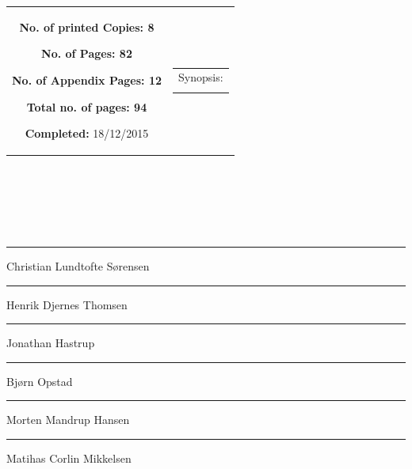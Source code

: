 {\begin{tabular}{cc}
{	\begin{description}
		\item { \textbf{No. of printed Copies: 8} }
		\item { \textbf{No. of Pages: 82} } 
		\item { \textbf{No. of Appendix Pages: 12} }
		\item { \textbf{Total no. of pages: 94} } 
		\item { \textbf{Completed:} 18/12/2015}
	\end{description}
	\vfill } &
	\parbox{7cm}{
 	 \vspace{.15cm}
  	\hfill 
  	\begin{tabular}{l}
  		{ Synopsis:}\bigskip \\
  		\fbox{
  		\parbox{6.5cm}{\bigskip
     		{\vfill{\small 
     		\bigskip}}
     	}}
   	\end{tabular}}
\end{tabular}
}%
\\
\vfill
{}

\null\vfill
\begin{center}\hspace*{\fill} \\[4cm]
\begin{minipage}{0.4\textwidth}
\begin{flushleft} \large
$ $ \\[2.5cm]
{\rule{\linewidth}{0.5mm}}
Christian Lundtofte Sørensen\\[2cm]
{\rule{\linewidth}{0.5mm}}
Henrik Djernes Thomsen\\[2cm]
{\rule{\linewidth}{0.5mm}}
Jonathan Hastrup\\[2cm]
\end{flushleft}
\end{minipage}
\begin{minipage}{0.4\textwidth}
\begin{flushright} \large
{\rule{\linewidth}{0.5mm}}
Bjørn Opstad\\[2cm]
{\rule{\linewidth}{0.5mm}}
Morten Mandrup Hansen\\[2cm]
{\rule{\linewidth}{0.5mm}}
Matihas Corlin Mikkelsen\\[2cm]
\end{flushright}
\end{minipage}

\end{center}
\vfill\clearpage

%